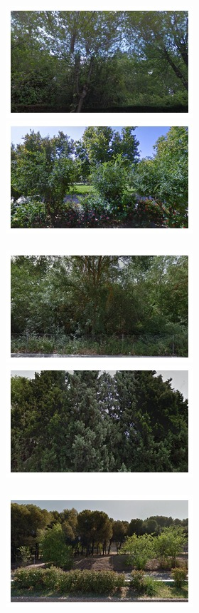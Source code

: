 \begin{figure}
  \begin{minipage}{\linewidth}
    \begin{minipage}{0.3\linewidth}
      \includegraphics[width=0.49\linewidth]{imgs/vege/mosaicsT2/mosaic0000.jpg}
      \includegraphics[width=0.49\linewidth]{imgs/vege/mosaicsT2/mosaic0001.jpg}
      \\ \vspace{-3mm} \\
      \includegraphics[width=0.49\linewidth]{imgs/vege/mosaicsT2/mosaic0002.jpg}
      \includegraphics[width=0.49\linewidth]{imgs/vege/mosaicsT2/mosaic0003.jpg}
      \\ \vspace{-3mm} \\
      \includegraphics[width=0.49\linewidth]{imgs/vege/mosaicsT2/mosaic0004.jpg}

\end{minipage}
\end{minipage}
\end{figure}
